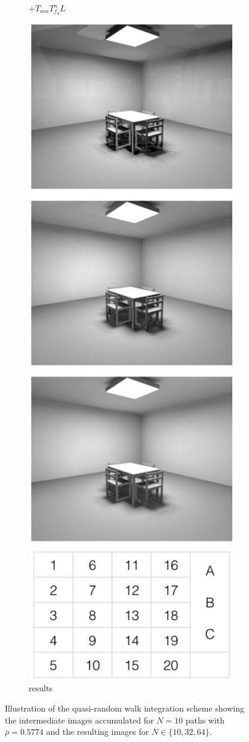 \begin{figure}
\begin{center}
\begin{subfigure}[b]{0.37\textwidth}
		\caption{$+T_{mn}T^{n}_{f_d}L$}
	\end{subfigure}
	\begin{subfigure}[b]{0.235\textwidth}
		\includegraphics[width=1.0\textwidth]{graphics/ir/ir-1-3}
		\caption{results}
	\end{subfigure}
\end{center}
\caption{Illustration of the quasi-random walk integration scheme showing the intermediate images accumulated for $N=10$ paths with $\overline{\rho}=0.5774$ and the resulting images for $N\in\{ 10,32,64\}$.}
\end{figure}





